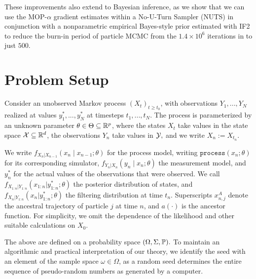 \documentclass[9pt,twocolumn,twoside]{pnas-new}
\begin{document}
These improvements also extend to Bayesian inference, as we show that we can use the MOP-$\alpha$ gradient estimates within a No-U-Turn Sampler (NUTS) \cite{homan14} in conjunction with a nonparametric empirical Bayes-style prior estimated with IF2 to reduce the burn-in period of particle MCMC \cite{andrieu10} from the $1.4 \times 10^6$ iterations in \cite{fasiolo16} to just $500$. 

\section{Problem Setup}

Consider an unobserved Markov process $(X_t)_{t \geq t_0}$, with observations $Y_1,...,Y_N$ realized at values $y_1^*,...,y_N^*$ at timesteps $t_1,..., t_N$. The process is parameterized by an unknown parameter $\theta \in \Theta \subseteq \mathbb{R}^p$, where the states $X_t$ take values in the state space ${\mathcal{X}} \subseteq \mathbb{R}^d$, the observations $Y_n$ take values in ${\mathcal{Y}},$ and we write $X_n := X_{t_n}$. 


We write $f_{X_n|X_{n-1}}\left(x_{n} \mid x_{n-1}; \theta\right)$ for the process model, writing $\texttt{process}\left(x_n; \theta\right)$ for its corresponding simulator, $f_{Y_n|X_n}\left(y_n \mid x_n; \theta\right)$ the measurement model, and $y_n^*$ for the actual values of the observations that were observed. We call $f_{X_{1:n}|Y_{1:n}}(x_{1:n}|y_{1:n}^*; \theta)$ the posterior distribution of states, and $f_{X_{n}|Y_{1:n}}(x_n|y_{1:n}^*; \theta)$ the filtering distribution at time $t_n$. Superscripts $x_{n,j}^A$ denote the ancestral trajectory of particle $j$ at time $n$, and $a(\cdot)$ is the ancestor function. For simplicity, we omit the dependence of the likelihood and other suitable calculations on $X_0.$ 

The above are defined on a probability space $(\Omega, \Sigma, \mathbb{P}).$ 
To maintain an algorithmic and practical interpretation of our theory, we identify the seed with an element of the sample space $\omega \in \Omega$, as a random seed determines the entire sequence of pseudo-random numbers as generated by a computer. 
\end{document}
